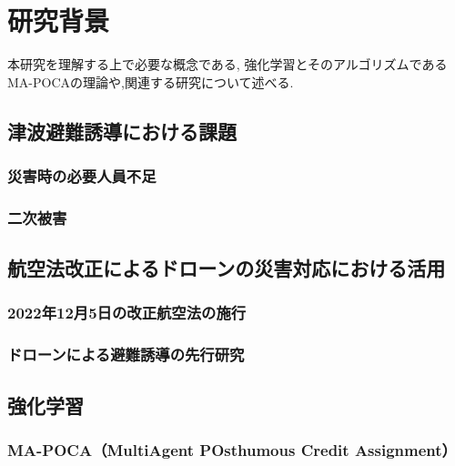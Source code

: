 \chapter{研究背景}
本研究を理解する上で必要な概念である, 強化学習とそのアルゴリズムであるMA-POCAの理論や,関連する研究について述べる.

\section{津波避難誘導における課題}
  \subsection{災害時の必要人員不足}
  \subsection{二次被害}
\section{航空法改正によるドローンの災害対応における活用}
  \subsection{2022年12月5日の改正航空法の施行}
  \subsection{ドローンによる避難誘導の先行研究}
\section{強化学習}
  \subsection{MA-POCA（MultiAgent POsthumous Credit Assignment）}


